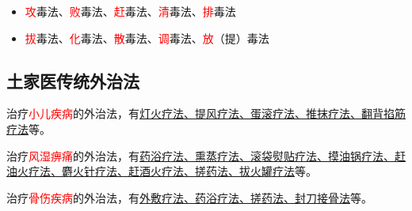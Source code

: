 \documentclass[cn,hazy,blue,12pt,normal,founder]{elegantnote}
\newcommand{\redt}[1]{\textcolor{red}{{}#1}}      %
\begin{document}
\begin{itemize}
  \item \redt{攻}毒法、\redt{败}毒法、\redt{赶}毒法、\redt{清}毒法、\redt{排}毒法
  \item \redt{拔}毒法、\redt{化}毒法、\redt{散}毒法、\redt{调}毒法、\redt{放}（提）毒法
\end{itemize}

\subsection{土家医传统外治法}

治疗\redt{小儿疾病}的外治法，有\uline{灯火疗法、提风疗法、蛋滚疗法、推抹疗法、翻背掐筋} \\ \uline{疗法}等。

治疗\redt{风湿痹痛}的外治法，有\uline{药浴疗法、熏蒸疗法、滚袋熨贴疗法、摸油锅疗法、赶} \\ \uline{油火疗法、麝火针疗法、赶酒火疗法、搓药法、拔火罐疗法}等。

治疗\redt{骨伤疾病}的外治法，有\uline{外敷疗法、药浴疗法、搓药法、封刀接骨法}等。
\end{document}
